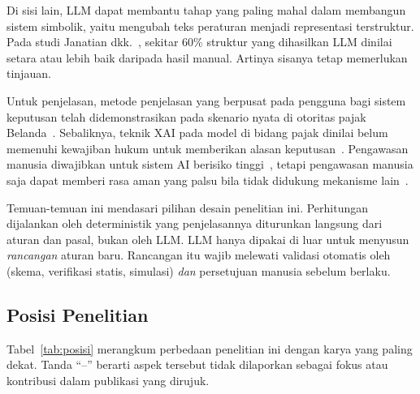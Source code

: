 Di sisi lain, LLM dapat membantu tahap yang paling mahal dalam membangun sistem simbolik, yaitu mengubah teks peraturan menjadi representasi terstruktur. Pada studi Janatian dkk.~\cite{janatian2023texttostructure}, sekitar 60\% struktur yang dihasilkan LLM dinilai setara atau lebih baik daripada hasil manual. Artinya sisanya tetap memerlukan tinjauan.

Untuk penjelasan, metode penjelasan yang berpusat pada pengguna bagi sistem keputusan  telah didemonstrasikan pada skenario nyata di otoritas pajak Belanda~\cite{zuurmond2023explanation}. Sebaliknya, teknik XAI  pada model  di bidang pajak dinilai belum memenuhi kewajiban hukum untuk memberikan alasan keputusan~\cite{gorski2025xaitax}. Pengawasan manusia diwajibkan untuk sistem AI berisiko tinggi~\cite{enqvist2023oversight}, tetapi pengawasan manusia saja dapat memberi rasa aman yang palsu bila tidak didukung mekanisme lain~\cite{green2022oversight}.

Temuan-temuan ini mendasari pilihan desain penelitian ini. Perhitungan dijalankan oleh  deterministik yang penjelasannya diturunkan langsung dari aturan dan pasal, bukan oleh LLM. LLM hanya dipakai di luar  untuk menyusun \emph{rancangan} aturan baru. Rancangan itu wajib melewati validasi otomatis oleh  (skema, verifikasi statis, simulasi) \emph{dan} persetujuan manusia sebelum berlaku.

\subsection{Posisi Penelitian}

Tabel~\ref{tab:posisi} merangkum perbedaan penelitian ini dengan karya yang paling dekat. Tanda ``--'' berarti aspek tersebut tidak dilaporkan sebagai fokus atau kontribusi dalam publikasi yang dirujuk.

